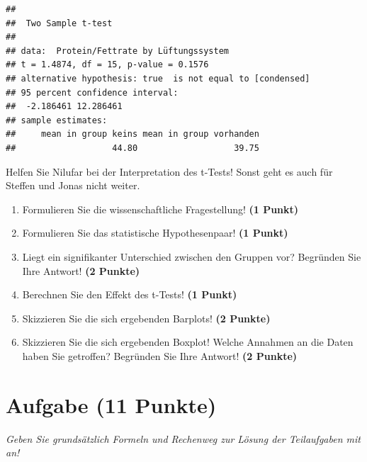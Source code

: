 \documentclass[a4paper, 9pt]{scrartcl}\usepackage[]{graphicx}\usepackage[]{xcolor}
\makeatletter
\newenvironment{kframe}{%
 \def\at@end@of@kframe{}%
 \ifinner\ifhmode%
  \def\at@end@of@kframe{\end{minipage}}%
  \begin{minipage}{\columnwidth}%
 \fi\fi%
 \def\FrameCommand##1{\hskip\@totalleftmargin \hskip-\fboxsep
 \colorbox{shadecolor}{##1}\hskip-\fboxsep
     \hskip-\linewidth \hskip-\@totalleftmargin \hskip\columnwidth}%
 \MakeFramed {\advance\hsize-\width
   \@totalleftmargin\z@ \linewidth\hsize
   \@setminipage}}%
 {\par\unskip\endMakeFramed%
 \at@end@of@kframe}
\newenvironment{knitrout}{}{} %
\makeatother
\begin{document}
\begin{knitrout}
\color{fgcolor}\begin{kframe}
\begin{verbatim}
## 
## 	Two Sample t-test
## 
## data:  Protein/Fettrate by Lüftungssystem
## t = 1.4874, df = 15, p-value = 0.1576
## alternative hypothesis: true  is not equal to [condensed]
## 95 percent confidence interval:
##  -2.186461 12.286461
## sample estimates:
##     mean in group keins mean in group vorhanden 
##                   44.80                   39.75
\end{verbatim}
\end{kframe}
\end{knitrout}

Helfen Sie Nilufar bei der Interpretation des t-Tests! Sonst geht es auch für Steffen und Jonas nicht weiter.
  
\begin{enumerate}
  \item Formulieren Sie die wissenschaftliche Fragestellung! \textbf{(1 Punkt)}
  \item Formulieren Sie das statistische Hypothesenpaar! \textbf{(1 Punkt)}
\item Liegt ein signifikanter Unterschied zwischen den Gruppen vor? Begründen Sie Ihre Antwort! \textbf{(2 Punkte)}
\item Berechnen Sie den Effekt des t-Tests! \textbf{(1 Punkt)}
\item Skizzieren Sie die sich ergebenden Barplots! \textbf{(2 Punkte)}
\item Skizzieren Sie die sich ergebenden Boxplot! Welche Annahmen an die Daten haben Sie getroffen? Begründen Sie Ihre Antwort! \textbf{(2 Punkte)} 
\end{enumerate}
 
\clearpage

\section{Aufgabe \hfill (11 Punkte)}

\textit{Geben Sie grundsätzlich Formeln und Rechenweg zur Lösung der Teilaufgaben mit an!} \\[1Ex]
 
\end{document}
